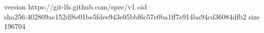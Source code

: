 version https://git-lfs.github.com/spec/v1
oid sha256:402809ae152df8e01be5fdee943e05bbf6c57e0ba1ff7e914ba94cd36084dfb2
size 196704
